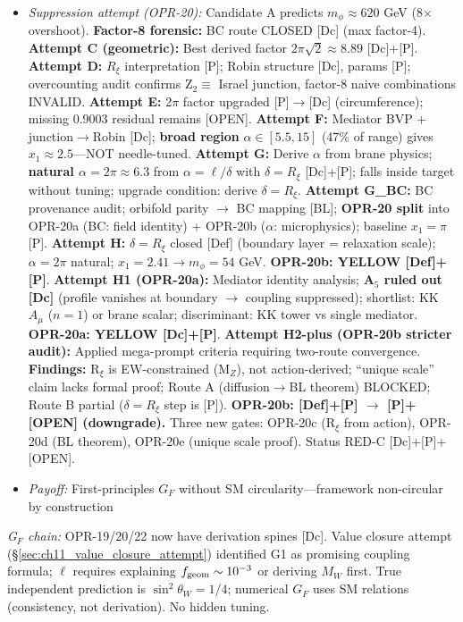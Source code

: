 \begin{tcolorbox}[colback=blue!5, colframe=blue!60!black,
    title=\textbf{OPR Closure Plan: Prioritized Research Program}]
\begin{itemize}[nosep]
    \item \emph{Suppression attempt (OPR-20):} Candidate A predicts $m_\phi \approx 620$ GeV (8$\times$ overshoot). \textbf{Factor-8 forensic:} BC route CLOSED [Dc] (max factor-4). \textbf{Attempt C (geometric):} Best derived factor $2\pi\sqrt{2} \approx 8.89$ [Dc]+[P]. \textbf{Attempt D:} $R_\xi$ interpretation [P]; Robin structure [Dc], params [P]; overcounting audit confirms Z$_2 \equiv$ Israel junction, factor-8 naive combinations INVALID. \textbf{Attempt E:} 2$\pi$ factor upgraded [P]$\to$[Dc] (circumference); missing 0.9003 residual remains [OPEN]. \textbf{Attempt F:} Mediator BVP + junction$\to$Robin [Dc]; \textbf{broad region} $\alpha \in [5.5, 15]$ (47\% of range) gives $x_1 \approx 2.5$---NOT needle-tuned. \textbf{Attempt G:} Derive $\alpha$ from brane physics; \textbf{natural $\alpha = 2\pi \approx 6.3$} from $\alpha = \ell/\delta$ with $\delta = R_\xi$ [Dc]+[P]; falls inside target without tuning; upgrade condition: derive $\delta = R_\xi$. \textbf{Attempt G\_BC:} BC provenance audit; orbifold parity $\to$ BC mapping [BL]; \textbf{OPR-20 split} into OPR-20a (BC: field identity) + OPR-20b ($\alpha$: microphysics); baseline $x_1 = \pi$ [P]. \textbf{Attempt H:} $\delta = R_\xi$ closed [Def] (boundary layer = relaxation scale); $\alpha = 2\pi$ natural; $x_1 = 2.41 \to m_\phi = 54$ GeV. \textbf{OPR-20b: YELLOW [Def]+[P]}. \textbf{Attempt H1 (OPR-20a):} Mediator identity analysis; \textbf{A$_5$ ruled out [Dc]} (profile vanishes at boundary $\to$ coupling suppressed); shortlist: KK $A_\mu$ ($n=1$) or brane scalar; discriminant: KK tower vs single mediator. \textbf{OPR-20a: YELLOW [Dc]+[P]}. \textbf{Attempt H2-plus (OPR-20b stricter audit):} Applied mega-prompt criteria requiring two-route convergence. \textbf{Findings:} R$_\xi$ is EW-constrained (M$_Z$), not action-derived; ``unique scale'' claim lacks formal proof; Route A (diffusion$\to$BL theorem) BLOCKED; Route B partial ($\delta = R_\xi$ step is [P]). \textbf{OPR-20b: [Def]+[P] $\to$ [P]+[OPEN] (downgrade).} Three new gates: OPR-20c (R$_\xi$ from action), OPR-20d (BL theorem), OPR-20e (unique scale proof). Status RED-C [Dc]+[P]+[OPEN].
    \item \emph{Payoff:} First-principles $G_F$ without SM circularity---framework non-circular by construction
\end{itemize}
\noindent\emph{G$_F$ chain:} OPR-19/20/22 now have derivation spines [Dc]. Value closure attempt (\S\ref{sec:ch11_value_closure_attempt}) identified G1 as promising coupling formula; $\ell$ requires explaining $f_{\rm geom} \sim 10^{-3}$ or deriving $M_W$ first. True independent prediction is $\sin^2\theta_W = 1/4$; numerical $G_F$ uses SM relations (consistency, not derivation). No hidden tuning.


\end{tcolorbox}
